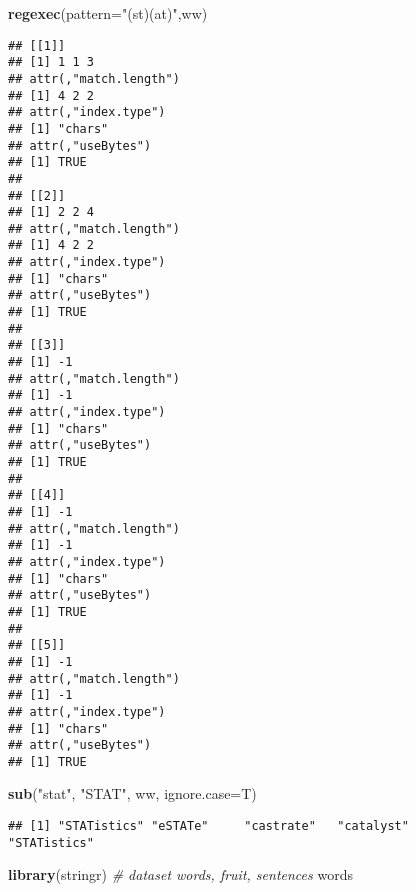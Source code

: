 \documentclass[
]{article}
\newenvironment{Shaded}{\begin{snugshade}}{\end{snugshade}}
\newcommand{\AttributeTok}[1]{\textcolor[rgb]{0.13,0.29,0.53}{#1}}
\newcommand{\CommentTok}[1]{\textcolor[rgb]{0.56,0.35,0.01}{\textit{#1}}}
\newcommand{\FunctionTok}[1]{\textcolor[rgb]{0.13,0.29,0.53}{\textbf{#1}}}
\newcommand{\NormalTok}[1]{#1}
\newcommand{\StringTok}[1]{\textcolor[rgb]{0.31,0.60,0.02}{#1}}
\begin{document}
\begin{Shaded}
\begin{Highlighting}[]
\FunctionTok{regexec}\NormalTok{(}\AttributeTok{pattern=}\StringTok{"(st)(at)"}\NormalTok{,ww)}
\end{Highlighting}
\end{Shaded}

\begin{verbatim}
## [[1]]
## [1] 1 1 3
## attr(,"match.length")
## [1] 4 2 2
## attr(,"index.type")
## [1] "chars"
## attr(,"useBytes")
## [1] TRUE
## 
## [[2]]
## [1] 2 2 4
## attr(,"match.length")
## [1] 4 2 2
## attr(,"index.type")
## [1] "chars"
## attr(,"useBytes")
## [1] TRUE
## 
## [[3]]
## [1] -1
## attr(,"match.length")
## [1] -1
## attr(,"index.type")
## [1] "chars"
## attr(,"useBytes")
## [1] TRUE
## 
## [[4]]
## [1] -1
## attr(,"match.length")
## [1] -1
## attr(,"index.type")
## [1] "chars"
## attr(,"useBytes")
## [1] TRUE
## 
## [[5]]
## [1] -1
## attr(,"match.length")
## [1] -1
## attr(,"index.type")
## [1] "chars"
## attr(,"useBytes")
## [1] TRUE
\end{verbatim}

\begin{Shaded}
\begin{Highlighting}[]
\FunctionTok{sub}\NormalTok{(}\StringTok{"stat"}\NormalTok{, }\StringTok{"STAT"}\NormalTok{, ww, }\AttributeTok{ignore.case=}\NormalTok{T)}
\end{Highlighting}
\end{Shaded}

\begin{verbatim}
## [1] "STATistics" "eSTATe"     "castrate"   "catalyst"   "STATistics"
\end{verbatim}

\begin{Shaded}
\begin{Highlighting}[]
\FunctionTok{library}\NormalTok{(stringr)}
\CommentTok{\# dataset words, fruit, sentences}
\NormalTok{words}
\end{Highlighting}
\end{Shaded}
\end{document}

